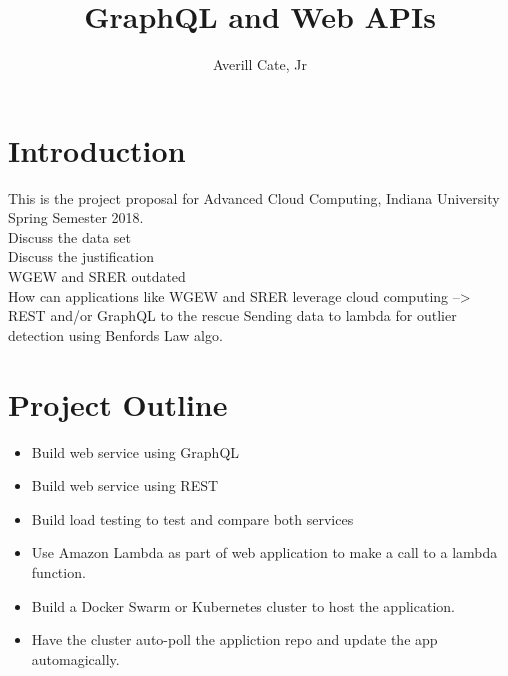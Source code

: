 \documentclass{article}
\title{GraphQL and Web APIs}
\author{Averill Cate, Jr}
\begin{document}
\maketitle

\section{Introduction}
This is the project proposal for Advanced Cloud Computing, Indiana University 
Spring Semester 2018.
\\
Discuss the data set\\
Discuss the justification\\
WGEW and SRER outdated\\
How can applications like WGEW and SRER leverage cloud computing --> REST and/or GraphQL to the rescue
Sending data to lambda for outlier detection using Benfords Law algo.

\section{Project Outline}
\begin{itemize}
\item Build web service using GraphQL
\item Build web service using REST
\item Build load testing to test and compare both services
\item Use Amazon Lambda as part of web application to make a call to a lambda function.
\item Build a Docker Swarm or Kubernetes cluster to host the application.
\item Have the cluster auto-poll the appliction repo and update the app automagically.
\end{itemize}
\end{document}
